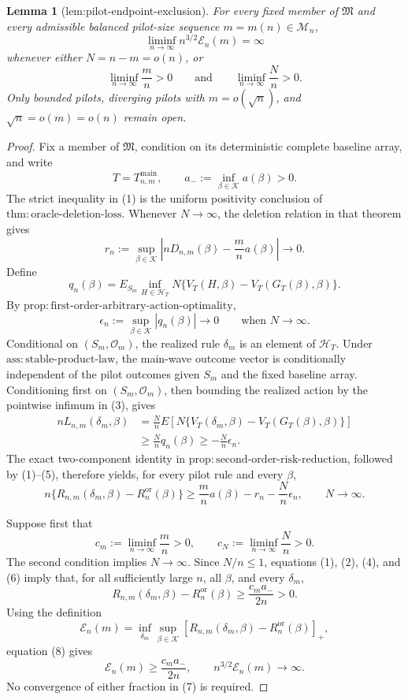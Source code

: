\documentclass{article}
\newtheorem{lemma}{Lemma}
\begin{document}
\begin{lemma}[lem:pilot-endpoint-exclusion]\label{lem:pilot-endpoint-exclusion}
For every fixed member of \(\mathfrak M\) and every admissible balanced pilot-size sequence \(m=m(n)\in\mathcal M_n\),
\[
\liminf_{n\to\infty}n^{3/2}\mathcal E_n(m)=\infty
\]
whenever either \(N=n-m=o(n)\), or
\[
\liminf_{n\to\infty}\frac mn>0
\qquad\text{and}\qquad
\liminf_{n\to\infty}\frac Nn>0.
\]
Only bounded pilots, diverging pilots with \(m=o(\sqrt n)\), and \(\sqrt n=o(m)=o(n)\) remain open.
\end{lemma}
\begin{proof}
Fix a member of \(\mathfrak M\), condition on its deterministic complete baseline array, and write
\[
T=T_{n,m}^{\mathrm{main}},
\qquad
a_-:=\inf_{\beta\in\mathcal K}a(\beta)>0.
\tag{1}
\]
The strict inequality in (1) is the uniform positivity conclusion of \(\mathrm{thm{:}oracle\text{-}deletion\text{-}loss}\).  Whenever \(N\to\infty\), the deletion relation in that theorem gives
\[
r_n:=\sup_{\beta\in\mathcal K}
\left|nD_{n,m}(\beta)-\frac mn a(\beta)\right|
\longrightarrow0.
\tag{2}
\]
Define
\[
q_n(\beta)=E_{S_m}\inf_{H\in\mathcal H_T}
N\{V_T(H,\beta)-V_T(G_T(\beta),\beta)\}.
\tag{3}
\]
By \(\mathrm{prop{:}first\text{-}order\text{-}arbitrary\text{-}action\text{-}optimality}\),
\[
\epsilon_n:=\sup_{\beta\in\mathcal K}|q_n(\beta)|
\longrightarrow0
\qquad\text{when }N\to\infty.
\tag{4}
\]
Conditional on \((S_m,\mathcal O_m)\), the realized rule \(\delta_m\) is an element of \(\mathcal H_T\).  Under \(\mathrm{ass{:}stable\text{-}product\text{-}law}\), the main-wave outcome vector is conditionally independent of the pilot outcomes given \(S_m\) and the fixed baseline array.  Conditioning first on \((S_m,\mathcal O_m)\), then bounding the realized action by the pointwise infimum in (3), gives
\[
\begin{aligned}
nL_{n,m}(\delta_m,\beta)
&=\frac Nn E\!\left[
N\{V_T(\delta_m,\beta)-V_T(G_T(\beta),\beta)\}
\right]\\
&\geq\frac Nn q_n(\beta)
\geq-\frac Nn\epsilon_n.
\end{aligned}
\tag{5}
\]
The exact two-component identity in \(\mathrm{prop{:}second\text{-}order\text{-}risk\text{-}reduction}\), followed by (1)--(5), therefore yields, for every pilot rule and every \(\beta\),
\[
n\{R_{n,m}(\delta_m,\beta)-R_n^{\mathrm{or}}(\beta)\}
\geq\frac mn a(\beta)-r_n-\frac Nn\epsilon_n,
\qquad N\to\infty.
\tag{6}
\]

Suppose first that
\[
c_m:=\liminf_{n\to\infty}\frac mn>0,
\qquad
c_N:=\liminf_{n\to\infty}\frac Nn>0.
\tag{7}
\]
The second condition implies \(N\to\infty\).  Since \(N/n\leq1\), equations (1), (2), (4), and (6) imply that, for all sufficiently large \(n\), all \(\beta\), and every \(\delta_m\),
\[
R_{n,m}(\delta_m,\beta)-R_n^{\mathrm{or}}(\beta)
\geq\frac{c_m a_-}{2n}>0.
\tag{8}
\]
Using the definition
\[
\mathcal E_n(m)=\inf_{\delta_m}\sup_{\beta\in\mathcal K}
[R_{n,m}(\delta_m,\beta)-R_n^{\mathrm{or}}(\beta)]_+,
\tag{9}
\]
equation (8) gives
\[
\mathcal E_n(m)\geq\frac{c_m a_-}{2n},
\qquad
n^{3/2}\mathcal E_n(m)\longrightarrow\infty.
\tag{10}
\]
No convergence of either fraction in (7) is required.


\end{proof}
\end{document}
